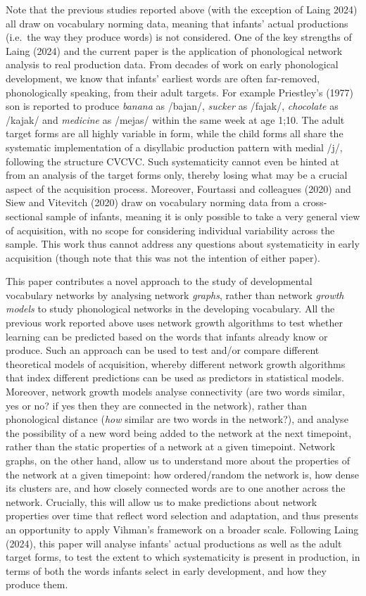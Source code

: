 \documentclass[
  man]{apa6}
\begin{document}
Note that the previous studies reported above (with the exception of Laing 2024) all draw on vocabulary norming data, meaning that infants' actual productions (i.e.~the way they produce words) is not considered. One of the key strengths of Laing (2024) and the current paper is the application of phonological network analysis to real production data. From decades of work on early phonological development, we know that infants' earliest words are often far-removed, phonologically speaking, from their adult targets. For example Priestley's (1977) son is reported to produce \emph{banana} as /bajan/, \emph{sucker} as /fajak/, \emph{chocolate} as /kajak/ and \emph{medicine} as /mejas/ within the same week at age 1;10. The adult target forms are all highly variable in form, while the child forms all share the systematic implementation of a disyllabic production pattern with medial /j/, following the structure CVCVC. Such systematicity cannot even be hinted at from an analysis of the target forms only, thereby losing what may be a crucial aspect of the acquisition process. Moreover, Fourtassi and colleagues (2020) and Siew and Vitevitch (2020) draw on vocabulary norming data from a cross-sectional sample of infants, meaning it is only possible to take a very general view of acquisition, with no scope for considering individual variability across the sample. This work thus cannot address any questions about systematicity in early acquisition (though note that this was not the intention of either paper).

This paper contributes a novel approach to the study of developmental vocabulary networks by analysing network \emph{graphs}, rather than network \emph{growth models} to study phonological networks in the developing vocabulary. All the previous work reported above uses network growth algorithms to test whether learning can be predicted based on the words that infants already know or produce. Such an approach can be used to test and/or compare different theoretical models of acquisition, whereby different network growth algorithms that index different predictions can be used as predictors in statistical models. Moreover, network growth models analyse connectivity (are two words similar, yes or no? if yes then they are connected in the network), rather than phonological distance (\emph{how} similar are two words in the network?), and analyse the possibility of a new word being added to the network at the next timepoint, rather than the static properties of a network at a given timepoint. Network graphs, on the other hand, allow us to understand more about the properties of the network at a given timepoint: how ordered/random the network is, how dense its clusters are, and how closely connected words are to one another across the network. Crucially, this will allow us to make predictions about network properties over time that reflect word selection and adaptation, and thus presents an opportunity to apply Vihman's framework on a broader scale. Following Laing (2024), this paper will analyse infants' actual productions as well as the adult target forms, to test the extent to which systematicity is present in production, in terms of both the words infants select in early development, and how they produce them.
\end{document}

